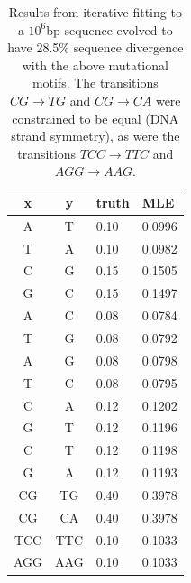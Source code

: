\documentclass{article}
\newcommand{\nA}{\mbox{A}}  %
\newcommand{\nC}{\mbox{C}}
\newcommand{\nG}{\mbox{G}}
\newcommand{\nT}{\mbox{T}}
\theoremstyle{plain}
\theoremstyle{definition}
\begin{document}

\begin{table}
  \begin{center}
        \begin{tabular}{c@{\quad$\to$\quad}c@{\quad at rate\quad }ll}
          \hline
            x & y & truth & MLE \\
          \hline
          \nA  &   \nT           & 0.10 & 0.0996 \\
          \nT  &   \nA           & 0.10 & 0.0982 \\
          \nC  &   \nG           & 0.15 & 0.1505 \\
          \nG  &   \nC           & 0.15 & 0.1497 \\
          \nA  &   \nC           & 0.08 & 0.0784 \\
          \nT  &   \nG           & 0.08 & 0.0792 \\
          \nA  &   \nG           & 0.08 & 0.0798 \\
          \nT  &   \nC           & 0.08 & 0.0795 \\
          \nC  &   \nA           & 0.12 & 0.1202 \\
          \nG  &   \nT           & 0.12 & 0.1196 \\
          \nC  &   \nT           & 0.12 & 0.1198 \\
          \nG  &   \nA           & 0.12 & 0.1193 \\
       \nC\nG  &  \nT\nG         & 0.40 & 0.3978 \\
       \nC\nG  &  \nC\nA         & 0.40 & 0.3978 \\
    \nT\nC\nC  &  \nT\nT\nC      & 0.10 & 0.1033 \\
    \nA\nG\nG  &  \nA\nA\nG      & 0.10 & 0.1033 \\
           \hline
        \end{tabular}
  \end{center}
  \caption{ Results from iterative fitting to a $10^6$bp sequence
    evolved to have 28.5\% sequence divergence
    with the above mutational motifs. The transitions $CG \to TG$ and $CG \to CA$
    were constrained to be equal (DNA strand symmetry),
    as were the transitions $TCC \to TTC$ and $AGG \to AAG$.
    \label{tab:cpg_results} }
\end{table}
\end{document}
